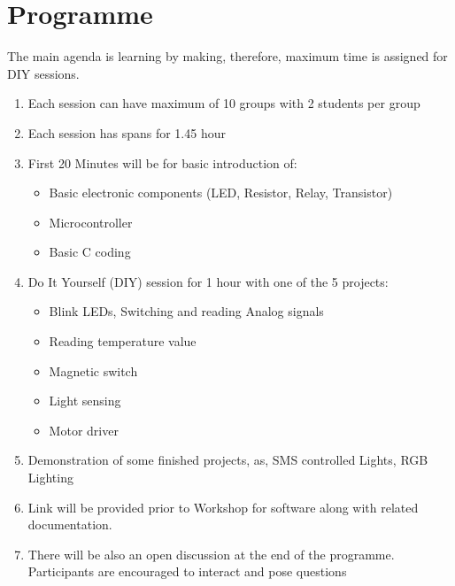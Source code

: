 \documentclass[12pt]{article} %
\begin{document}
\pagebreak

\section{Programme} %
The main agenda is learning by making, therefore, maximum time is assigned for DIY sessions.
\begin{enumerate}
\item Each session can have maximum of 10 groups with 2 students per group
\item Each session has spans for 1.45 hour
\item First 20 Minutes will be for basic introduction of:  
	\begin{itemize}
		\item Basic electronic components (LED, Resistor, Relay, Transistor)
		\item Microcontroller
		\item Basic C coding
	\end{itemize}
\item Do It Yourself (DIY) session for 1 hour with one of the 5 projects:
	\begin{itemize}
	\item Blink LEDs, Switching and reading Analog signals
	\item Reading temperature value
	\item Magnetic switch
	\item Light sensing
	\item Motor driver
	\end{itemize}
\item Demonstration of some finished projects, as, SMS controlled Lights, RGB Lighting
\item Link will be provided prior to Workshop for software along with related documentation.
\item There will be also an open discussion at the end of the programme. Participants are encouraged to interact and pose questions
\end{enumerate}


\pagebreak

\end{document}
